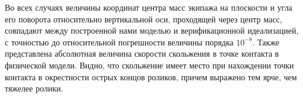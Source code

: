 
Во всех случаях величины координат центра масс экипажа на плоскости и угла его поворота относительно вертикальной оси, проходящей через центр масс, совпадают между построенной нами моделью и верификационной идеализацией, с точностью до относительной погрешности величины порядка $10^{-8}$. Также представлена абсолютная величина скорости скольжения в точке контакта в физической модели. Видно, что скольжение имеет место при нахождении точки контакта в окрестности острых концов роликов, причем выражено тем ярче, чем тяжелее ролики.\\



